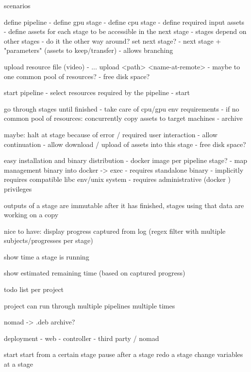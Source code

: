 scenarios

define pipeline
 - define gpu stage
 - define cpu stage
 - define required input assets
 - define assets for each stage to be accessible in the next stage
 - stages depend on other stages
    - do it the other way around? set next stage?
       - next stage + "parameters" (assets to keep/transfer)
       - allows branching

upload resource file (video)
 - ... upload <path> <name-at-remote>
 - maybe to one common pool of resources?
    - free disk space?

start pipeline
 - select resources required by the pipeline
 - start
 
go through stages until finished
 - take care of cpu/gpu env requirements
 - if no common pool of resources: concurrently copy assets to target machines
 - archive 

maybe: halt at stage because of error / required user interaction
 - allow continuation
 - allow download / upload of assets into this stage
    - free disk space?
 
 
 easy installation and binary distribution
  - docker image per pipeline stage?
  - map management binary into docker -> exec
     - requires standalone binary
     - implicitly requires compatible libc env/unix system
     - requires administrative (docker ) privileges
     
 
 outputs of a stage are immutable after it has finished, stages using that data are working on a copy
 
 nice to have: display progress captured from log (regex filter with multiple subjects/progresses per stage)
 
 show time a stage is running
 
 show estimated remaining time (based on captured progress)
     
  todo list per project
  
  project can run through multiple pipelines multiple times
  
  nomad -> .deb archive?
  
deployment
 - web
 - controller
 - third party / nomad
     
start
start from a certain stage
pause after a stage
redo a stage
change variables at a stage